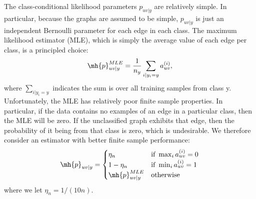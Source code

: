 \documentclass[10pt,journal,cspaper,compsoc]{IEEEtran}
\begin{document}
The class-conditional likelihood parameters $p_{uv|y}$ are relatively simple.  In particular, because the graphs are assumed to be simple, $p_{uv|y}$ is just an independent Bernoulli parameter for each edge in each class.  The maximum likelihood estimator (MLE), which is simply the average value of each edge per class, is a principled choice:
\begin{align}
\mh{p}_{uv|y}^{MLE} = \frac{1}{n_y} \sum_{i | y_i = y} a_{uv}^{(i)},
\end{align}
where $\sum_{i | y_i=y}$ indicates the sum is over all training samples from class y. Unfortunately, the MLE has relatively poor finite sample properties.  In particular, if the data contains no examples of an edge in a particular class, then the MLE will be zero.  If the unclassified graph exhibits that edge, then the probability of it being from that class is zero, which is undesirable. We therefore consider an estimator with better finite sample performance:
\begin{align} \label{eq:lik}
\mh{p}_{uv|y} = 
\begin{cases}
\eta_n & \text{if } \max_i a_{uv}^{(i)}=0 \\
1- \eta_n & \text{if } \min_i a_{uv}^{(i)}=1 \\
\mh{p}_{uv|y}^{MLE} & \text{otherwise}
\end{cases}
\end{align}
where we let $\eta_n=1/(10n)$.  

\end{document}
